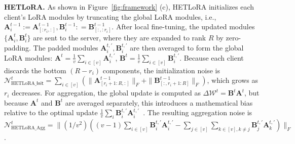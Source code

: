 \documentclass{article} %
\newcommand{\Init}{\mathsf{Init}}
\begin{document}
\textbf{HETLoRA.} 
As shown in Figure~\ref{fig:framework} (c), HETLoRA initializes each client’s LoRA modules by truncating the global LoRA modules, i.e., $\mathbf{A}_i^{t-1} :=\mathbf{A}_{[:r_i,:]}^{t-1},\mathbf{B}_i^{t-1}: =\mathbf{B}^{t-1}_{[:,:r_i]}$. After local fine-tuning, the updated modules $\{\mathbf{A}_i^{t}, \mathbf{B}_i^{t}\}$ are sent to the server, where they are expanded to rank $R$ by zero-padding. The padded modules ${\mathbf{A}_i^{t,\prime}, \mathbf{B}_i^{t,\prime}}$ are then averaged to form the global LoRA modules: ${\mathbf{A}}^t=\frac{1}{v}\sum_{i\in[v]}\mathbf{A}_i^{t,\prime}$, ${\mathbf{B}}^t=\frac{1}{v}\sum_{i\in[v]}\mathbf{B}_i^{t,\prime}$. Because each client discards the bottom $(R-r_i)$ components, the initialization noise is  $\mathcal{N}_{\text{HETLoRA\_}\Init}^{t}  = \sum_{i\in[v]} ( \|{\mathbf{A}^{t-1}_{[r_i+1:R,:]}}\|_F + \|{\mathbf{B}}^{t-1}_{[:,r_i+1:R]}\|_F)$, which grows as $r_i$ decreases. For aggregation, the global update is computed as $\Delta\boldsymbol{\mathcal{W}}^t = \mathbf{B}^t \mathbf{A}^t$, but because $\mathbf{A}^t$ and $\mathbf{B}^t$ are averaged separately, this introduces a mathematical bias relative to the optimal update $\tfrac{1}{v}\sum_i \mathbf{B}_i^{t,\prime}\mathbf{A}_i^{t,\prime}$~\cite{wangflora,sun2024improving}. The resulting aggregation noise is $\mathcal{N}_{\text{HETLoRA\_Agg}}^{t} = \| ({1}/{v^2}) ( (v-1) \sum_{i \in [v]} \mathbf{B}_i^{t,\prime} \mathbf{A}_i^{t,\prime} - \sum_{j \in [v]} \sum_{k \in [v], k \neq j} \mathbf{B}_j^{t,\prime} \mathbf{A}_k^{t,\prime} ) \|_F$. 

\end{document}
